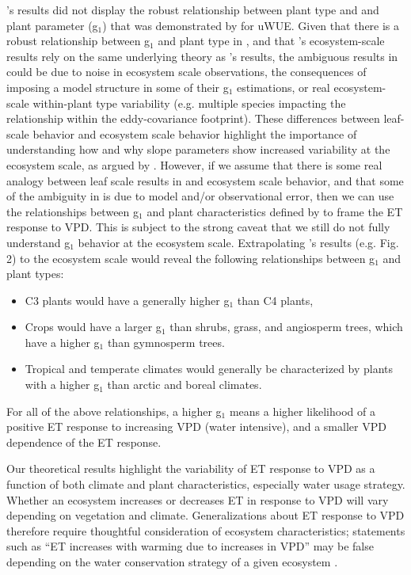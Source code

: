's results did not display the robust relationship
between plant type and and plant parameter (g$_1$) that was
demonstrated by  for uWUE. Given that there is a
robust relationship between g$_1$ and plant type in ,
and that 's ecosystem-scale results rely on the same
underlying theory as 's results, the ambiguous
results in  could be due to noise in ecosystem
scale observations, the consequences of imposing a model structure in
some of their g$_1$ estimations, or real ecosystem-scale within-plant
type variability (e.g. multiple species impacting the relationship
within the eddy-covariance footprint). These differences between
leaf-scale behavior and ecosystem scale behavior highlight the
importance of understanding how and why slope parameters show
increased variability at the ecosystem scale, as argued by
. However, if we assume that there is some real
analogy between leaf scale results in  and ecosystem
scale behavior, and that some of the ambiguity in 
is due to model and/or observational error, then we can use the
relationships between g$_1$ and plant characteristics defined by  to
frame the ET response to VPD. This is subject
to the strong caveat that we still do not fully understand g$_1$
behavior at the ecosystem scale. Extrapolating 's
results (e.g. Fig. 2) to the ecosystem scale would reveal the
following relationships between g$_1$ and plant types:

\begin{itemize}
  \item C3 plants would have a generally higher g$_1$ than C4 plants,
  \item Crops would have a larger g$_1$ than shrubs, grass, and
    angiosperm trees, which have a higher g$_1$ than gymnosperm
    trees.
  \item Tropical and temperate climates would generally be
    characterized by plants with a higher g$_1$ than arctic and boreal
    climates.
\end{itemize}
For all of the above relationships, a higher g$_1$ means a higher
likelihood of a positive ET response to increasing VPD (water
intensive), and a smaller VPD dependence of the ET response.

Our theoretical results highlight the variability of ET
response to VPD as a function of both climate  and plant
characteristics, especially water usage strategy. Whether an
ecosystem increases or decreases ET in response to VPD will vary
depending on vegetation and climate. Generalizations about ET response
to VPD therefore require thoughtful consideration of ecosystem
characteristics; statements such as ``ET increases with warming due to
increases in VPD'' may be false depending on the water conservation
strategy of a given ecosystem \cite{Lemordant_2018}.


